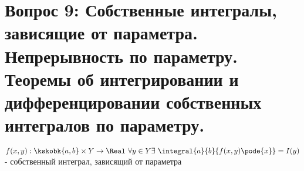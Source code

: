 \section{Вопрос 9: Собственные интегралы, зависящие от параметра. Непрерывность по параметру. Теоремы об интегрировании и дифференцировании собственных интегралов по параметру.}

\begin{defs}
	$f(x,y) : \kskobk{a,b} \times Y \to \Real \ \forall y \in Y \exists \ \integral{a}{b}{f(x,y)\pode{x}} = I(y)$ - собственный интеграл, зависящий от параметра
\end{defs}
